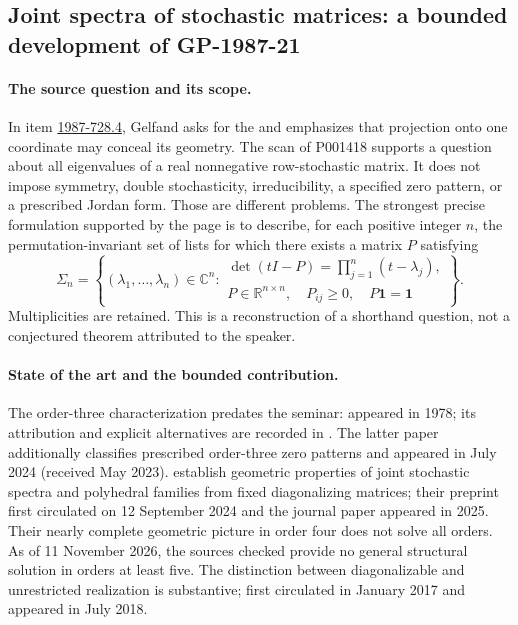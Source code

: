 \subsection{Joint spectra of stochastic matrices: a bounded development of GP-1987-21}
\label{dev:stochastic}

\paragraph{The source question and its scope.}
In item \hyperref[item:1987-728.4]{1987-728.4}, Gelfand asks for the
 and emphasizes that projection onto
one coordinate may conceal its geometry. The scan of P001418 supports a
question about all eigenvalues of a real nonnegative row-stochastic matrix.
It does not impose symmetry, double stochasticity, irreducibility, a specified
zero pattern, or a prescribed Jordan form. Those are different problems.
The strongest precise formulation supported by the page is to describe,
for each positive integer \(n\), the permutation-invariant set of lists
for which there exists a matrix \(P\) satisfying
\[
 \Sigma_n=\left\{(\lambda_1,\ldots,\lambda_n)\in\mathbb C^n:
 \begin{array}{l}
 \det(tI-P)=\prod_{j=1}^n(t-\lambda_j),\\
 P\in\mathbb R^{n\times n},\quad
 P_{ij}\geq0,\quad P\mathbf1=\mathbf1
 \end{array}\right\}.
\]
Multiplicities are retained. This is a reconstruction of a shorthand
question, not a conjectured theorem attributed to the speaker.

\paragraph{State of the art and the bounded contribution.}
The order-three characterization predates the seminar:
\citet{loewylondon1978inverse} appeared in 1978; its attribution and
explicit alternatives are recorded in \citet[p.~506]{ranteng2024patterns}.
The latter paper additionally classifies prescribed order-three zero patterns
and appeared in July 2024 (received May 2023).
\citet[Theorems~3.9--3.12 and Sections~4--5, 8]{johnsonpaparella2025perron}
establish geometric properties of joint stochastic spectra and polyhedral
families from fixed diagonalizing matrices; their preprint first circulated
on 12 September 2024 and the journal paper appeared in 2025.
Their nearly complete geometric picture in order four does not solve
all orders. As of 11 November 2026, the sources checked provide no general
structural solution in orders at least five. The distinction between
diagonalizable and unrestricted realization is substantive;
\citet[Section~2 and Proposition~1]{croninlaffey2018diagonalizable}
first circulated in January 2017 and appeared in July 2018.

